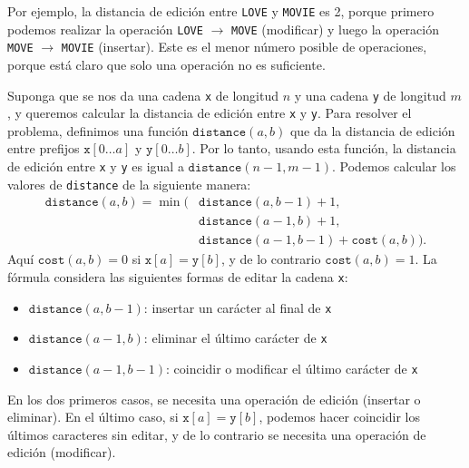 Por ejemplo, la distancia de edición entre
\texttt{LOVE} y \texttt{MOVIE} es 2,
porque primero podemos realizar la operación
 \texttt{LOVE} $\rightarrow$ \texttt{MOVE}
(modificar) y luego la operación
\texttt{MOVE} $\rightarrow$ \texttt{MOVIE}
(insertar).
Este es el menor número posible de operaciones,
porque está claro que solo una operación no es suficiente.

Suponga que se nos da una cadena \texttt{x}
de longitud $n$ y una cadena \texttt{y} de longitud $m$,
y queremos calcular la distancia de edición entre
\texttt{x} y \texttt{y}.
Para resolver el problema, definimos una función
$\texttt{distance}(a,b)$ que da la
distancia de edición entre prefijos
$\texttt{x}[0 \ldots a]$ y $\texttt{y}[0 \ldots b]$.
Por lo tanto, usando esta función, la distancia de edición
entre \texttt{x} y \texttt{y} es igual a $\texttt{distance}(n-1,m-1)$.
Podemos calcular los valores de \texttt{distance}
de la siguiente manera:
\begin{equation*}
\begin{split}
\texttt{distance}(a,b) = \min(& \texttt{distance}(a,b-1)+1, \\
                           & \texttt{distance}(a-1,b)+1, \\
                           & \texttt{distance}(a-1,b-1)+\texttt{cost}(a,b)).
\end{split}
\end{equation*}
Aquí $\texttt{cost}(a,b)=0$ si $\texttt{x}[a]=\texttt{y}[b]$,
y de lo contrario $\texttt{cost}(a,b)=1$.
La fórmula considera las siguientes formas de
editar la cadena \texttt{x}:
\begin{itemize}
\item $\texttt{distance}(a,b-1)$: insertar un carácter al final de \texttt{x}
\item $\texttt{distance}(a-1,b)$: eliminar el último carácter de \texttt{x}
\item $\texttt{distance}(a-1,b-1)$: coincidir o modificar el último carácter de \texttt{x}
\end{itemize}
En los dos primeros casos, se necesita una operación de edición
(insertar o eliminar).
En el último caso, si $\texttt{x}[a]=\texttt{y}[b]$,
podemos hacer coincidir los últimos caracteres sin editar,
y de lo contrario se necesita una operación de edición (modificar).

